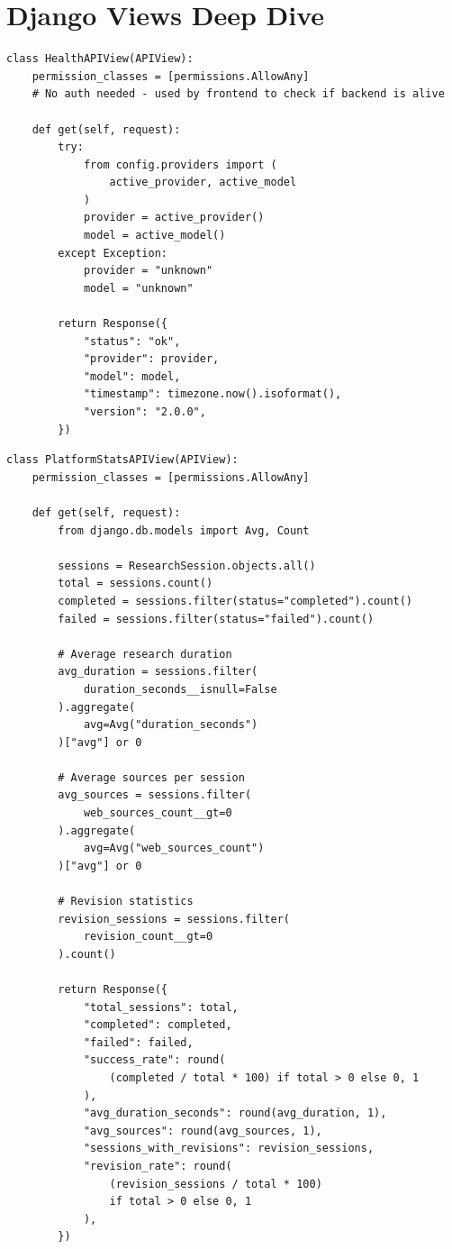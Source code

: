\documentclass[11pt,a4paper,twoside]{report}
\begin{document}
\section{Django Views Deep Dive}

\begin{lstlisting}[style=pythonstyle,caption={views.py --- Health Check with Provider Info}]
class HealthAPIView(APIView):
    permission_classes = [permissions.AllowAny]
    # No auth needed - used by frontend to check if backend is alive

    def get(self, request):
        try:
            from config.providers import (
                active_provider, active_model
            )
            provider = active_provider()
            model = active_model()
        except Exception:
            provider = "unknown"
            model = "unknown"

        return Response({
            "status": "ok",
            "provider": provider,
            "model": model,
            "timestamp": timezone.now().isoformat(),
            "version": "2.0.0",
        })
\end{lstlisting}

\begin{lstlisting}[style=pythonstyle,caption={views.py --- Platform Statistics}]
class PlatformStatsAPIView(APIView):
    permission_classes = [permissions.AllowAny]

    def get(self, request):
        from django.db.models import Avg, Count

        sessions = ResearchSession.objects.all()
        total = sessions.count()
        completed = sessions.filter(status="completed").count()
        failed = sessions.filter(status="failed").count()

        # Average research duration
        avg_duration = sessions.filter(
            duration_seconds__isnull=False
        ).aggregate(
            avg=Avg("duration_seconds")
        )["avg"] or 0

        # Average sources per session
        avg_sources = sessions.filter(
            web_sources_count__gt=0
        ).aggregate(
            avg=Avg("web_sources_count")
        )["avg"] or 0

        # Revision statistics
        revision_sessions = sessions.filter(
            revision_count__gt=0
        ).count()

        return Response({
            "total_sessions": total,
            "completed": completed,
            "failed": failed,
            "success_rate": round(
                (completed / total * 100) if total > 0 else 0, 1
            ),
            "avg_duration_seconds": round(avg_duration, 1),
            "avg_sources": round(avg_sources, 1),
            "sessions_with_revisions": revision_sessions,
            "revision_rate": round(
                (revision_sessions / total * 100)
                if total > 0 else 0, 1
            ),
        })
\end{lstlisting}
\end{document}
